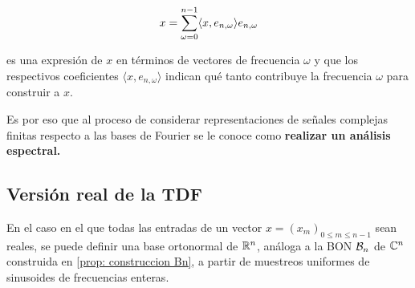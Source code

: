 \[
x = \sum\limits_{\omega=0}^{n-1}\langle x, e_{n,\omega} \rangle e_{n,\omega}
\]

\noindent
es una expresión de $x$ en términos de vectores de frecuencia
$\omega$ y que los respectivos coeficientes 
$\langle x, e_{n,\omega} \rangle$ indican qué tanto 
contribuye la frecuencia $\omega$ para construir a $x$.

Es por eso que al proceso de considerar representaciones
de señales complejas finitas respecto a las bases de Fourier
se le conoce como  
\textbf{realizar un análisis espectral.}


\subsection{Versión real de la TDF}

En el caso en el que todas las entradas de un vector
$x = (x_{m})_{0 \leq m \leq n-1}$ sean reales, se puede definir
una base ortonormal de $\mathbb{R}^{n}$, 
análoga a la BON $\mathcal{B}_{n}$ de $\mathbb{C}^{n}$ construida en 
\ref{prop: construccion Bn},
a partir de muestreos uniformes
de sinusoides de frecuencias enteras.


